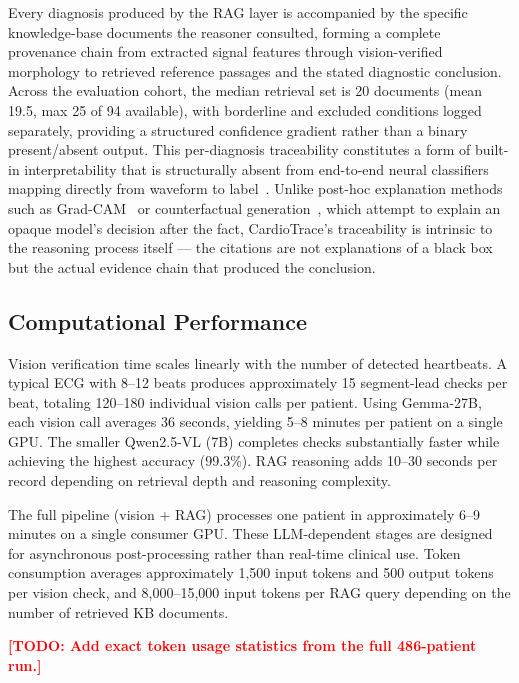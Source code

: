 \documentclass[journal,compsoc]{IEEEtran}
\newcommand{\system}{CardioTrace}
\newcommand{\todo}[1]{\textcolor{red}{\textbf{[TODO: #1]}}}
\begin{document}
Every diagnosis produced by the RAG layer is accompanied by the specific knowledge-base documents the reasoner consulted, forming a complete provenance chain from extracted signal features through vision-verified morphology to retrieved reference passages and the stated diagnostic conclusion. Across the evaluation cohort, the median retrieval set is 20 documents (mean 19.5, max 25 of 94 available), with borderline and excluded conditions logged separately, providing a structured confidence gradient rather than a binary present/absent output. This per-diagnosis traceability constitutes a form of built-in interpretability that is structurally absent from end-to-end neural classifiers mapping directly from waveform to label~\cite{rudin2019stop}. Unlike post-hoc explanation methods such as Grad-CAM~\cite{ecgxplaim2025} or counterfactual generation~\cite{gcx2025}, which attempt to explain an opaque model's decision after the fact, \system{}'s traceability is intrinsic to the reasoning process itself --- the citations are not explanations of a black box but the actual evidence chain that produced the conclusion.

\subsection{Computational Performance}
\label{sec:results_timing}

Vision verification time scales linearly with the number of detected heartbeats. A typical ECG with 8--12 beats produces approximately 15 segment-lead checks per beat, totaling 120--180 individual vision calls per patient. Using Gemma-27B, each vision call averages 36 seconds, yielding 5--8 minutes per patient on a single GPU. The smaller Qwen2.5-VL (7B) completes checks substantially faster while achieving the highest accuracy (99.3\%). RAG reasoning adds 10--30 seconds per record depending on retrieval depth and reasoning complexity.

The full pipeline (vision + RAG) processes one patient in approximately 6--9 minutes on a single consumer GPU. These LLM-dependent stages are designed for asynchronous post-processing rather than real-time clinical use. Token consumption averages approximately 1,500 input tokens and 500 output tokens per vision check, and 8,000--15,000 input tokens per RAG query depending on the number of retrieved KB documents.

\todo{Add exact token usage statistics from the full 486-patient run.}


\end{document}
